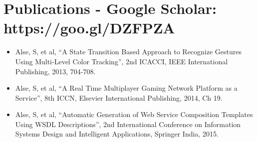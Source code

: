 \documentclass{article} %
\begin{document}
\section{Publications - \normalsize{Google Scholar: }\textup{https://goo.gl/DZFPZA}}
\begin{itemize}
\item Alse, S, et al, ``A State Transition Based Approach to Recognize Gestures Using Multi-Level Color Tracking'', 2nd ICACCI, IEEE International Publishing, 2013, 704-708.
\item Alse, S, et al, ``A Real Time Multiplayer Gaming Network Platform as a Service'', 8th ICCN, Elsevier International Publishing, 2014, Ch 19.
\item Alse, S, et al, ``Automatic Generation of Web Service Composition Templates Using WSDL Descriptions'', 2nd International Conference on Information Systems Design and Intelligent Applications, Springer India, 2015.
\end{itemize}
\end{document}
